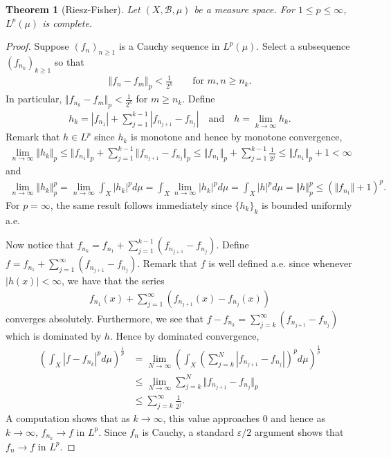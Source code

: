 \documentclass[11pt]{amsart}
\newtheorem{theorem}{Theorem}[section]
\theoremstyle{definition}
\numberwithin{equation}{section}
\begin{document}
\begin{theorem}[Riesz-Fisher]
    Let $(X,\mathcal B,\mu)$ be a measure space. For $1\le p\le \infty$, $L^p(\mu)$ is complete.
\end{theorem}
\begin{proof}
    Suppose $(f_n)_{n\ge 1}$ is a Cauchy sequence in $L^p(\mu)$. Select a subsequence $(f_{n_k})_{k\ge 1}$ so that
    \begin{align*}
        \Vert f_n-f_m\Vert_p<\frac{1}{2^k}\qquad\text{for }m,n\ge n_k.
    \end{align*}
    In particular, $\Vert f_{n_k}-f_m\Vert_p<\frac{1}{2^k}$ for $m\ge n_k$. Define
    \begin{align*}
        h_k=|f_{n_1}|+\sum_{j=1}^{k-1}|f_{n_{j+1}}-f_{n_j}|\quad\text{and}\quad h=\lim_{k\to\infty}h_k.
    \end{align*}
    Remark that $h\in L^p$ since $h_k$ is monotone and hence by monotone convergence,
    \begin{align*}
        \lim_{n\to\infty}\Vert h_k\Vert_p\le\Vert f_{n_1}\Vert_p+\sum_{j=1}^{k-1}\Vert f_{n_{j+1}}-f_{n_j}\Vert_p\le\Vert f_{n_1}\Vert_p+\sum_{j=1}^{k-1}\frac{1}{2^j}\le\Vert f_{n_1}\Vert_p+1<\infty
    \end{align*}
    and
    \begin{align*}
        \lim_{n\to\infty}\Vert h_k\Vert_p^p=\lim_{n\to\infty}\int_X|h_k|^pd\mu=\int_X\lim_{n\to\infty}|h_k|^pd\mu=\int_X|h|^pd\mu=\Vert h\Vert_p^p\le(\Vert f_{n_1}\Vert+1)^p.
    \end{align*}
    For $p=\infty$, the same result follows immediately since $\{h_k\}_k$ is bounded uniformly a.e.

    Now notice that $f_{n_k}=f_{n_1}+\sum_{j=1}^{k-1}(f_{n_{j+1}}-f_{n_j})$. Define $f=f_{n_1}+\sum_{j=1}^\infty(f_{n_{j+1}}-f_{n_j})$. Remark that $f$ is well defined a.e. since whenever $|h(x)|<\infty$, we have that the series 
    \begin{align*}
        f_{n_1}(x)+\sum_{j=1}^\infty(f_{n_{j+1}}(x)-f_{n_j}(x))
    \end{align*}
    converges absolutely. Furthermore, we see that $f-f_{n_k}=\sum_{j=k}^\infty (f_{n_{j+1}}-f_{n_j})$ which is dominated by $h$. Hence by dominated convergence,
    \begin{align*}
        \left(\int_X|f-f_{n_k}|^pd\mu\right)^\frac{1}{p}&=\lim_{N\to\infty}\left(\int_X\left(\sum_{j=k}^N|f_{n_{j+1}}-f_{n_j}|\right)^pd\mu\right)^\frac{1}{p}\\
        &\le\lim_{N\to\infty}\sum_{j=k}^N\Vert f_{n_{j+1}}-f_{n_j}\Vert_p\\
        &\le\sum_{j=k}^\infty\frac{1}{2^{j}}.
    \end{align*}
    A computation shows that as $k\to\infty$, this value approaches 0 and hence as $k\to\infty$, $f_{n_k}\to f$ in $L^p$. Since $f_n$ is Cauchy, a standard $\varepsilon/2$ argument shows that $f_n\to f$ in $L^p$.
\end{proof}
\end{document}
